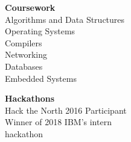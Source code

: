 \documentclass[]{anand-resume}
\begin{document}
\begin{minipage}[t]{0.30\textwidth}
\sectionsep
\textbf{Coursework} \\
Algorithms and Data Structures \\
Operating Systems \\
Compilers \\
Networking \\
Databases \\
Embedded Systems \\
\sectionsep

\textbf{Hackathons} \\
Hack the North 2016 Participant \\
Winner of 2018 IBM's intern \\ hackathon \\




%
%

\end{minipage} 
\hfill
\end{document}
